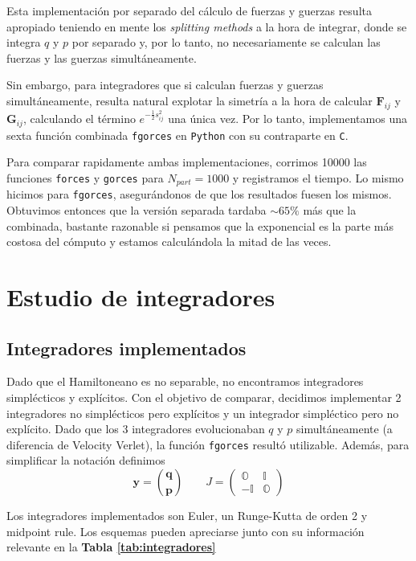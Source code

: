 \documentclass[twoside, 12pt]{article}
\begin{document}
Esta implementación por separado del cálculo de fuerzas y guerzas resulta apropiado teniendo en mente los \textit{splitting methods} a la hora de integrar, donde se integra $q$ y $p$ por separado y, por lo tanto, 
no necesariamente se calculan las fuerzas y las guerzas simultáneamente.

Sin embargo, para integradores que si calculan fuerzas y guerzas simultáneamente, resulta natural explotar la simetría a la hora de calcular $\mathbf{F}_{ij}$ y $\mathbf{G}_{ij}$, calculando el término 
$e^{-\frac{1}{2}s_{ij}^2}$ una única vez. Por lo tanto, implementamos una sexta función combinada \texttt{fgorces} en \texttt{Python} con su contraparte en \texttt{C}.

Para comparar rapidamente ambas implementaciones, corrimos 10000 las funciones \texttt{forces} y \texttt{gorces} para $N_{part} = 1000$ y registramos el tiempo. 
Lo mismo hicimos para \texttt{fgorces}, asegurándonos de que los resultados fuesen los mismos. 
Obtuvimos entonces que la versión separada tardaba $\sim 65\%$ más que la combinada, bastante razonable si pensamos que la exponencial es la parte más costosa del cómputo y estamos calculándola la mitad de las veces.

\section{Estudio de integradores}

\subsection{Integradores implementados}

Dado que el Hamiltoneano es no separable, no encontramos integradores simplécticos y explícitos. 
Con el objetivo de comparar, decidimos implementar 2 integradores no simplécticos pero explícitos y un integrador simpléctico pero no explícito. 
Dado que los 3 integradores evolucionaban $q$ y $p$ simultáneamente (a diferencia de Velocity Verlet), la función \texttt{fgorces} resultó utilizable. 
Además, para simplificar la notación definimos \[\mathbf{y} = \binom{\mathbf{q}}{\mathbf{p}} \qquad J = \begin{pmatrix}
\mathbb{O} & \mathbb{I} \\ 
-\mathbb{I} & \mathbb{O}
\end{pmatrix}
  \]

Los integradores implementados son Euler, un Runge-Kutta de orden 2 y midpoint rule. 
Los esquemas pueden apreciarse junto con su información relevante en la \textbf{Tabla \ref{tab:integradores}}
\end{document}
